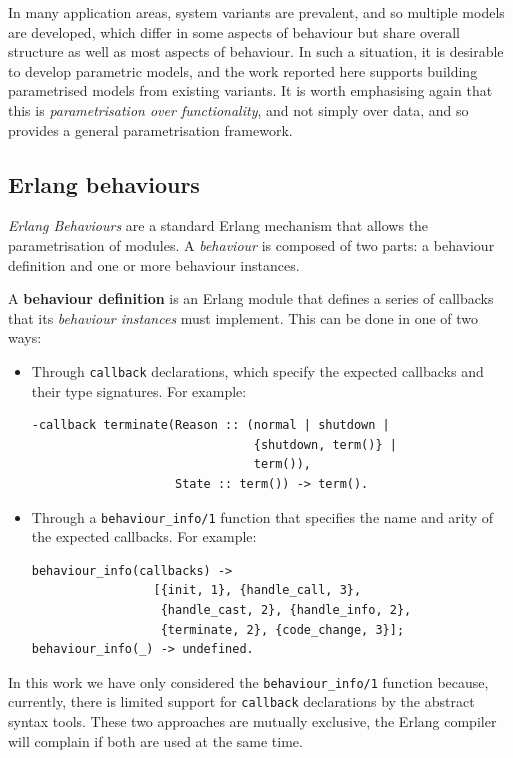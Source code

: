 In many application areas, system variants are prevalent, and so multiple models are developed, which differ in some 
aspects of behaviour but share overall structure as well as most aspects of behaviour. In such a situation, it is 
desirable to develop parametric models, and the work reported here supports building parametrised models from existing 
variants. It is worth emphasising again that this is \emph{parametrisation over functionality}, and not simply over 
data, and so provides a general parametrisation framework.


\subsection{Erlang behaviours\label{sec:erlang_behaviours}}

\emph{Erlang Behaviours} are a standard Erlang mechanism that allows the
parametrisation of modules. A \emph{behaviour} is composed of two parts: a behaviour definition and one or more behaviour instances.


A \textbf{behaviour definition} is an Erlang module that defines a series of callbacks
that its \emph{behaviour instances} must implement. This can be done
in one of two ways:

\begin{itemize}
\item Through \texttt{callback} declarations, which specify the expected
callbacks and their type signatures. For example:
{\small
\begin{verbatim}
-callback terminate(Reason :: (normal | shutdown |
                               {shutdown, term()} |
                               term()),
                    State :: term()) -> term().
\end{verbatim}
}

\item Through a \texttt{behaviour\_info/1} function that specifies the name
and arity of the expected callbacks. For example:
{\small
\begin{verbatim}
behaviour_info(callbacks) ->
                 [{init, 1}, {handle_call, 3},
                  {handle_cast, 2}, {handle_info, 2},
                  {terminate, 2}, {code_change, 3}];
behaviour_info(_) -> undefined.
\end{verbatim}
}
\end{itemize}

In this work we have only considered the \texttt{behaviour\_info/1}
function because, currently, there is limited support for \texttt{callback}
declarations by the abstract syntax tools. These two approaches are
mutually exclusive, the Erlang compiler will complain if both are
used at the same time.

